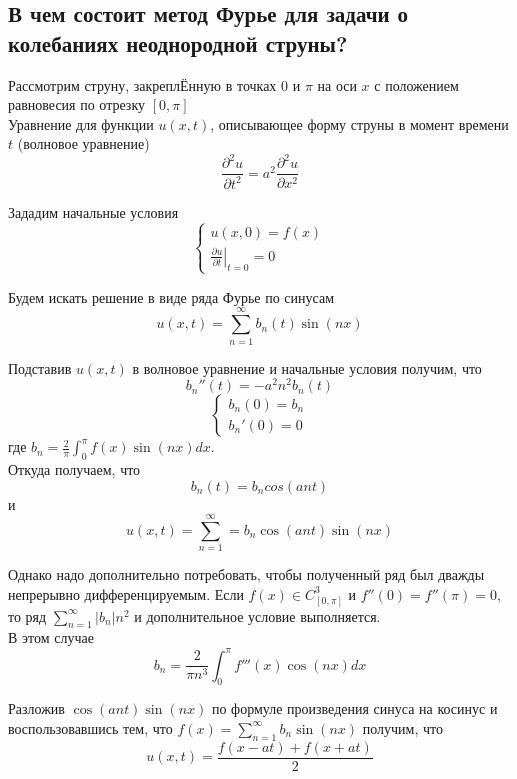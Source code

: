 \documentclass{article}
\begin{document}
\subsection{В чем состоит метод Фурье для задачи о колебаниях неоднородной струны?}
Рассмотрим струну, закрепл{\footnotesize Ё}нную в точках $ 0 $ и $ \pi $ на оси $ x $ с положением равновесия по отрезку $ [0, \pi] $\\
Уравнение для функции $ u(x, t) $, описывающее форму струны в момент времени $ t $ (волновое уравнение)
\[ \frac{\partial^2u}{\partial t^2} = a^2 \frac{\partial^2u}{\partial x^2}\]

Зададим начальные условия 
\[ \left\{\begin{matrix}
	u(x, 0) = f(x)\\ 
	\left. \frac{\partial u}{\partial t} \right| _{t=0} = 0
\end{matrix}\right. \]

Будем искать решение в виде ряда Фурье по синусам
\[ u(x, t) = \sum_{n=1}^{\infty} b_n(t)\sin(nx) \]

Подставив $ u(x, t) $ в волновое уравнение и начальные условия получим, что
\[ b_n '' (t) = -a^2 n^2 b_n(t) \]
\[ \left\{\begin{matrix}
	b_n(0) = b_n\\ 
	b_n'(0) = 0
\end{matrix}\right. \]
где $b_n = \frac{2}{\pi} \int_{0}^{\pi}f(x) \sin(nx)dx$.\\
Откуда получаем, что
\[ b_n(t)=b_n cos(ant) \]
и 
\[ u(x, t) = \sum_{n=1}^{\infty} =b_n \cos(ant)\sin(nx) \]

Однако надо дополнительно потребовать, чтобы полученный ряд был дважды непрерывно дифференцируемым. Если $ f(x) \in C_{[0, \pi]}^3$ и $ f''(0)=f''(\pi)=0 $, то ряд $ \sum_{n=1}^{\infty} |b_n|n^2 $ и дополнительное условие выполняется.\\
В этом случае 
\[ b_n = \frac{2}{\pi n^3} \int_{0}^{\pi}f'''(x) \cos(nx)dx \]

Разложив $  \cos(ant)\sin(nx) $ по формуле произведения синуса на косинус и воспользовавшись тем, что $ f(x) = \sum_{n=1}^{\infty} b_n \sin(nx) $ получим, что
\[ u(x, t) = \frac{f(x-at) + f(x+at)}{2} \]
\end{document}
